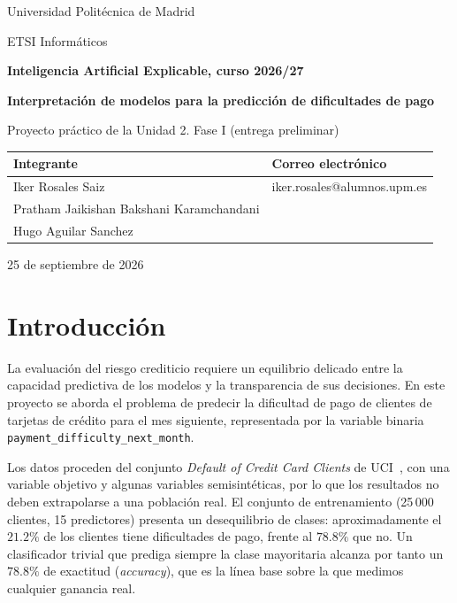 \documentclass[a4paper,11pt]{article}
\newcommand{\proyectotitulo}{Interpretación de modelos para la predicción de dificultades de pago}
\newcommand{\proyectosubtitulo}{Proyecto práctico de la Unidad 2. Fase I (entrega preliminar)}
\newcommand{\curso}{Inteligencia Artificial Explicable, curso 2026/27}
\newcommand{\fechaentrega}{25 de septiembre de 2026}
\begin{document}
\begin{titlepage}
\centering
\vspace*{2cm}
{\large Universidad Politécnica de Madrid\par}
{\large ETSI Informáticos\par}
\vspace{1.5cm}
{\Large\bfseries \curso\par}
\vspace{1.5cm}
{\huge\bfseries \proyectotitulo\par}
\vspace{0.5cm}
{\Large \proyectosubtitulo\par}
\vspace{2cm}

\begin{tabular}{ll}
\textbf{Integrante} & \textbf{Correo electrónico} \\
\midrule
Iker Rosales Saiz & iker.rosales@alumnos.upm.es \\
Pratham Jaikishan Bakshani Karamchandani &  \\
Hugo Aguilar Sanchez & \\
\end{tabular}

\vfill
{\large \fechaentrega\par}
\end{titlepage}

\section{Introducción}
La evaluación del riesgo crediticio requiere un equilibrio delicado entre la capacidad predictiva de los modelos y la transparencia de sus decisiones. En este proyecto se aborda el problema de predecir la dificultad de pago de clientes de tarjetas de crédito para el mes siguiente, representada por la variable binaria \texttt{payment\_difficulty\_next\_month}.

Los datos proceden del conjunto \textit{Default of Credit Card Clients} de UCI~\cite{uci2009,yeh2009}, con una variable objetivo y algunas variables semisintéticas, por lo que los resultados no deben extrapolarse a una población real. El conjunto de entrenamiento (25\,000 clientes, 15 predictores) presenta un desequilibrio de clases: aproximadamente el $21.2\%$ de los clientes tiene dificultades de pago, frente al $78.8\%$ que no. Un clasificador trivial que prediga siempre la clase mayoritaria alcanza por tanto un $78.8\%$ de exactitud (\textit{accuracy}), que es la línea base sobre la que medimos cualquier ganancia real.
\end{document}
